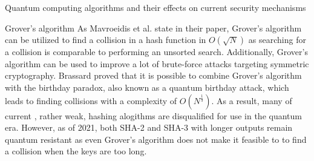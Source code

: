 \documentclass[aps,preprintnumbers,twocolumn]{revtex4}
\begin{document}
\begin{section}{Quantum computing algorithms and their effects on current security mechanisms}
\begin{subsection}{Grover's algorithm}
As Mavroeidis et al. \cite[p.4]{DBLP:journals/corr/abs-1804-00200} state in their paper, Grover's algorithm can be utilized to find a collision in a hash function in $O(\sqrt{N})$ as searching for a collision is comparable to performing an unsorted search. 
Additionally, Grover's algorithm can be used to improve a lot of brute-force attacks targeting symmetric cryptography.
Brassard proved \cite{1998} that it is possible to combine Grover's algorithm with the birthday paradox, 
also known as a quantum birthday attack, which leads to finding collisions with a complexity of $O(N^{\frac{1}{3}})$.
As a result, many of current , rather weak, hashing alogithms are disqualified for use in the quantum era. 
However, as of 2021, both SHA-2 and SHA-3 with longer outputs remain quantum resistant as even Grover's algorithm does not make it feasible to to find a collision when the keys are too long.
\end{subsection}

\end{section}
\end{document}
